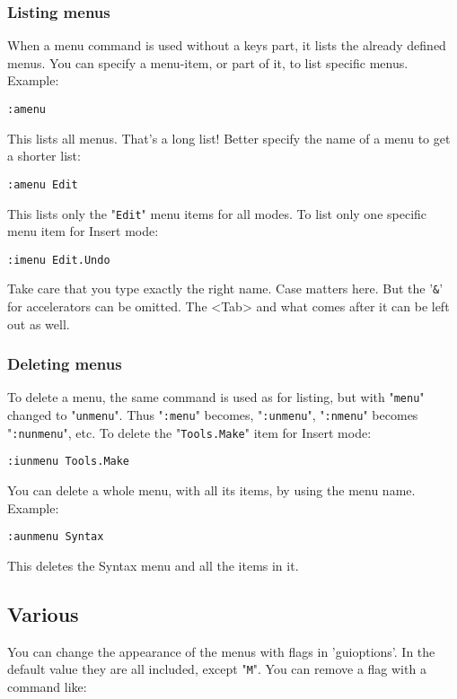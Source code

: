 \subsubsection{Listing menus}
When a menu command is used without a {keys} part, it lists the already defined menus.
You can specify a {menu-item}, or part of it, to list specific menus.
Example:

\begin{Verbatim}[samepage=true]
 :amenu
\end{Verbatim}

This lists all menus.
That's a long list!  Better specify the name of a menu to get a shorter list:

\begin{Verbatim}[samepage=true]
 :amenu Edit
\end{Verbatim}

This lists only the "\verb!Edit!" menu items for all modes.
To list only one specific menu item for Insert mode:

\begin{Verbatim}[samepage=true]
 :imenu Edit.Undo
\end{Verbatim}

Take care that you type exactly the right name.
Case matters here.
But the '\verb!&!' for accelerators can be omitted.
The <Tab> and what comes after it can be left out as well.

\subsubsection{Deleting menus}
To delete a menu, the same command is used as for listing, but with "\verb!menu!" changed to "\verb!unmenu!".
Thus "\verb!:menu!" becomes, "\verb!:unmenu!", "\verb!:nmenu!" becomes "\verb!:nunmenu!", etc.
To delete the "\verb!Tools.Make!" item for Insert mode:

\begin{Verbatim}[samepage=true]
 :iunmenu Tools.Make
\end{Verbatim}

You can delete a whole menu, with all its items, by using the menu name.
Example:

\begin{Verbatim}[samepage=true]
 :aunmenu Syntax
\end{Verbatim}

This deletes the Syntax menu and all the items in it.
\subsection{Various}
You can change the appearance of the menus with flags in 'guioptions'.
In the default value they are all included, except "\verb!M!".
You can remove a flag with a command like:

